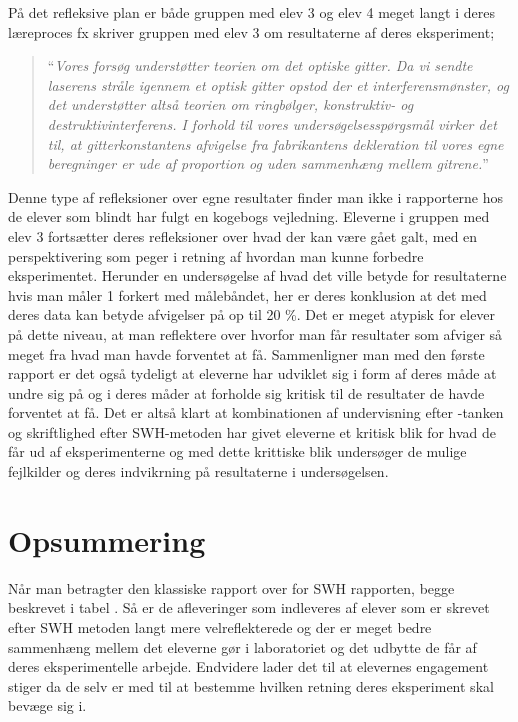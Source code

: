På det refleksive plan er både gruppen med elev 3 og elev 4 meget langt i deres læreproces fx skriver gruppen med elev 3 om resultaterne af deres eksperiment;
\begin{quote}
``\emph{Vores forsøg understøtter teorien om  det optiske gitter. Da vi sendte laserens stråle igennem et optisk gitter opstod der et interferensmønster, og det understøtter altså teorien om ringbølger, konstruktiv- og destruktivinterferens. I forhold til vores undersøgelsesspørgsmål virker det til, at gitterkonstantens afvigelse fra fabrikantens dekleration til vores egne beregninger er ude af proportion og uden sammenhæng mellem gitrene.}''
\end{quote}
Denne type af refleksioner over egne resultater finder man ikke i rapporterne hos de elever som blindt har fulgt en kogebogs vejledning. Eleverne i gruppen med elev 3 fortsætter deres refleksioner over hvad der kan være gået galt, med en perspektivering som peger i retning af hvordan man kunne forbedre eksperimentet. Herunder en undersøgelse af hvad det ville betyde for resultaterne hvis man måler 1 \centi\meter forkert med målebåndet, her er deres konklusion at det med deres data kan betyde afvigelser på op til 20 \%. Det er meget atypisk for elever på dette niveau, at man reflektere over hvorfor man får resultater som afviger så meget fra hvad man havde forventet at få. Sammenligner man med den første rapport er det også tydeligt at eleverne har udviklet sig i form af deres måde at undre sig på og i deres måder at forholde sig kritisk til de resultater de havde forventet at få. Det er altså klart at kombinationen af undervisning efter \ib-tanken og skriftlighed efter SWH-metoden har givet eleverne et kritisk blik for hvad de får ud af eksperimenterne og med dette krittiske blik undersøger de mulige fejlkilder og deres indvikrning på resultaterne i undersøgelsen. 

\section{Opsummering}
Når man betragter den klassiske rapport over for SWH rapporten, begge beskrevet i tabel . Så er de afleveringer som indleveres af elever som er skrevet efter SWH metoden langt mere velreflekterede og der er meget bedre sammenhæng mellem det eleverne gør i laboratoriet og det udbytte de får af deres eksperimentelle arbejde. Endvidere lader det til at elevernes engagement stiger da de selv er med til at bestemme hvilken retning deres eksperiment skal bevæge sig i.  

